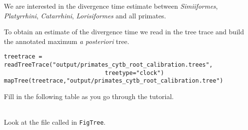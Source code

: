 We are interested in the divergence time estimate between \emph{Simiiformes}, \emph{Platyrrhini}, \emph{Catarrhini}, \emph{Lorisiformes} and all primates.

To obtain an estimate of the divergence time we read in the tree trace and build the annotated maximum \textit{a posteriori} tree.
{\tt \begin{snugshade*}
\begin{lstlisting}
treetrace = readTreeTrace("output/primates_cytb_root_calibration.trees",
                             treetype="clock")
mapTree(treetrace,"output/primates_cytb_root_calibration.tree")
\end{lstlisting}
\end{snugshade*}}
Fill in the following table as you go through the tutorial.

\noindent \\ \impmark Look at the file called  in \texttt{FigTree}.


